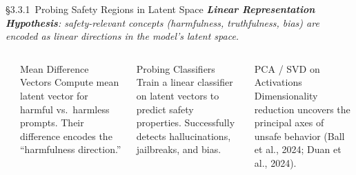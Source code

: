 \begin{frame}{\S3.3.1\ Probing Safety Regions in Latent Space}
  {\footnotesize\itshape \textbf{Linear Representation Hypothesis}: safety-relevant concepts (harmfulness, truthfulness, bias) are encoded as linear directions in the model's latent space.}
  \vspace{0.3em}
  \begin{columns}[T]
    {\small\bfseries{}}
    \begin{ucrcard}[UCRnavy]{Mean Difference Vectors}
      \scriptsize
      Compute mean latent vector for harmful vs.\ harmless prompts. Their difference encodes the ``harmfulness direction.''\\[2pt]
    \end{ucrcard}\vspace{2pt}
    \begin{ucrcard}[UCRnavy]{Probing Classifiers}
      \scriptsize
      Train a linear classifier on latent vectors to predict safety properties. Successfully detects hallucinations, jailbreaks, and bias.\\[2pt]
    \end{ucrcard}\vspace{2pt}
    \begin{ucrcard}[UCRnavy]{PCA / SVD on Activations}
      \scriptsize
      Dimensionality reduction uncovers the principal axes of unsafe behavior (Ball et al., 2024; Duan et al., 2024).
    \end{ucrcard}


\end{columns}
\end{frame}
